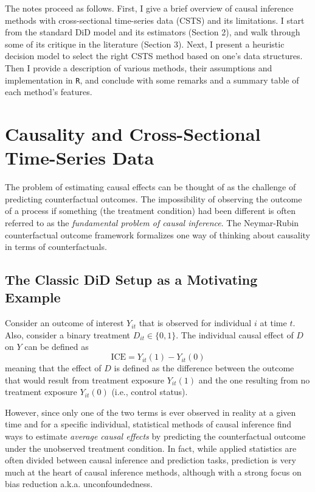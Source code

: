 \documentclass[hidelinks]{article}\usepackage[]{graphicx}\usepackage[]{color}
\begin{document}
The notes proceed as follows. First, I give a brief overview of causal inference methods with cross-sectional time-series data (CSTS) and its limitations. I start from the standard DiD model and its estimators (Section 2), and walk through some of its critique in the literature (Section 3). Next, I present a heuristic decision model to select the right CSTS method based on one's data structures. Then I provide a description of various methods, their assumptions and implementation in \texttt{R}, and conclude with some remarks and a summary table of each method's features.


\section{Causality and Cross-Sectional Time-Series Data}

The problem of estimating causal effects can be thought of as the challenge of predicting counterfactual outcomes. The impossibility of observing the outcome of a process if something (the treatment condition) had been different is often referred to as the \textit{fundamental problem of causal inference}. The Neymar-Rubin counterfactual outcome framework formalizes one way of thinking about causality in terms of counterfactuals. 

\subsection{The Classic DiD Setup as a Motivating Example}

Consider an outcome of interest $Y_{it}$ that is observed for individual $i$ at time $t$. Also, consider a binary treatment $D_{it} \in \{ 0, 1 \}$. The individual causal effect of $D$ on $Y$ can be defined as 
$$\text{ICE} = Y_{it}(1) - Y_{it}(0)$$
meaning that the effect of $D$ is defined as the difference between the outcome that would result from treatment exposure $Y_{it}(1)$ and the one resulting from no treatment exposure $Y_{it}(0)$ (i.e., control status).

However, since only one of the two terms is ever observed in reality at a given time and for a specific individual, statistical methods of causal inference find ways to estimate \textit{average causal effects} by predicting the counterfactual outcome under the unobserved treatment condition. In fact, while applied statistics are often divided between causal inference and prediction tasks, prediction is very much at the heart of causal inference methods, although with a strong focus on bias reduction a.k.a. unconfoundedness.
\end{document}
